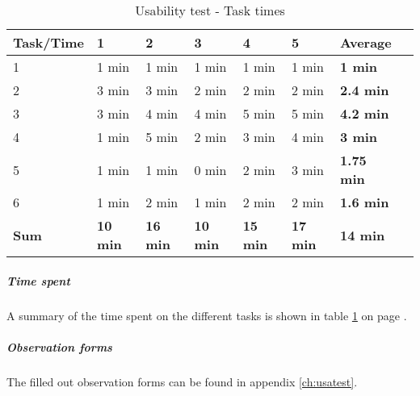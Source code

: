 \begin{table}[h!]
\begin{center}
\begin{tabular}{l|l|l|l|l|l|l|l}	\hline
\textbf{Task/Time}&\textbf{1}&\textbf{2}&\textbf{3}&\textbf{4}&\textbf{5}&\textbf{Average}\\ \hline \hline
				1&1 min&1 min&1 min&1 min&1 min&\textbf{1 min}\\ \hline
				2&3 min&3 min&2 min&2 min&2 min&\textbf{2.4 min}\\ \hline
				3&3 min&4 min&4 min&5 min&5 min&\textbf{4.2 min}\\ \hline
				4&1 min&5 min&2 min&3 min&4 min&\textbf{3 min}\\ \hline
				5&1 min&1 min&0 min&2 min&3 min&\textbf{1.75 min}\\ \hline
				6&1 min&2 min&1 min&2 min&2 min&\textbf{1.6 min}\\ \hline
				\textbf{Sum}&\textbf{10 min}&\textbf{16 min}&\textbf{10 min}&\textbf{15 min}&\textbf{17 min}&\textbf{14 min}\\ \hline 
				
\end{tabular}
\end{center}
\caption{Usability test - Task times} \label{tab:usabilitytasktime}
\end{table}

\subparagraph{Time spent}\hfill
\newline
A summary of the time spent on the different tasks is shown in table \ref{tab:usabilitytasktime} on page \pageref{tab:usabilitytasktime}.
			\subparagraph{Observation forms}\hfill
\newline
The filled out observation forms can be found in appendix \ref{ch:usatest}. 

\newpage

